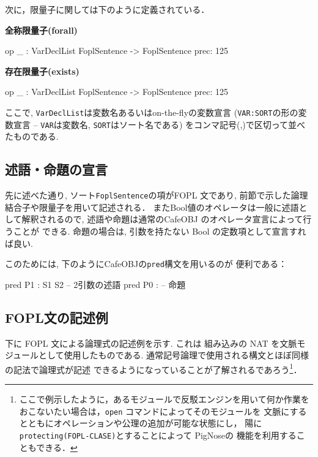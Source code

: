次に，限量子に関しては下のように定義されている．
\begin{description}
  \item \textbf{全称限量子(forall)}

    \begin{vvtm}
  \begin{simplev}
op \A[_] _ : VarDeclList FoplSentence -> FoplSentence {prec: 125}
  \end{simplev}
\end{vvtm}

\item \textbf{存在限量子(exists)}

  \begin{vvtm}
  \begin{simplev}
op \E[_] _ : VarDeclList FoplSentence -> FoplSentence {prec: 125}
  \end{simplev}
\end{vvtm}
\end{description}
ここで, \texttt{VarDeclList}は変数名あるいはon-the-flyの変数宣言
(\texttt{VAR:SORT}の形の変数宣言 -- \texttt{VAR}は変数名,
\texttt{SORT}はソート名である)
をコンマ記号(,)で区切って並べたものである. 

\subsection{述語・命題の宣言}
先に述べた通り, ソート\texttt{FoplSentence}の項がFOPL 文であり,
前節で示した論理結合子や限量子を用いて記述される．
またBool値のオペレータは一般に述語として解釈されるので,
述語や命題は通常のCafeOBJ のオペレータ宣言によって行うことが
できる. 
命題の場合は, 引数を持たない Bool の定数項として宣言すれば良い.

このためには, 下のようにCafeOBJの\texttt{pred}構文を用いるのが
便利である：
\begin{vvtm}
\begin{examplev}
  pred P1 : S1 S2           -- 2引数の述語
  pred P0 :                 -- 命題
\end{examplev}
\end{vvtm}


\subsection{FOPL文の記述例}

下に FOPL 文による論理式の記述例を示す.
これは 組み込みの NAT を文脈モジュールとして使用したものである.
通常記号論理で使用される構文とほぼ同様の記法で論理式が記述
できるようになっていることが了解されるであろう\footnote{%
ここで例示したように，あるモジュールで反駁エンジンを用いて何か作業を
おこないたい場合は，\texttt{open} コマンドによってそのモジュールを
文脈にするとともにオペレーションや公理の追加が可能な状態にし，
陽に\texttt{protecting(FOPL-CLASE)}とすることによって PigNoseの
機能を利用することもできる．
}．

